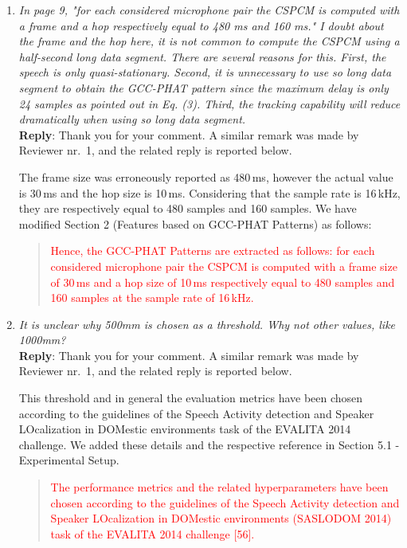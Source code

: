\documentclass[11pt, technote, letterpaper, oneside, onecolumn]{IEEEtran}
\begin{document}
\begin{enumerate}
\item  \textit{In page 9, "for each considered microphone pair the CSPCM is computed with a frame and a hop respectively equal to 480 ms and 160 ms." I doubt about the frame and the hop here, it is not common to compute the CSPCM using a half-second long data segment. There are several reasons for this. First, the speech is only quasi-stationary. Second, it is unnecessary to use so long data segment to obtain the GCC-PHAT pattern since the maximum delay is only 24 samples as pointed out in Eq. (3). Third, the tracking capability will reduce dramatically when using so long data segment.\\}
\textbf{Reply}: Thank you for your comment. A similar remark was made by Reviewer nr.\ 1, and the related reply is reported below.

The frame size was erroneously reported as 480\,ms, however the actual value is 30\,ms and the hop size is 10\,ms. Considering that the sample rate is 16\,kHz, they are respectively equal to 480 samples and 160 samples. We have modified Section 2 (Features based on GCC-PHAT Patterns) as follows:

\begin{quote}
	\textcolor{red}{Hence, the GCC-PHAT Patterns are extracted as follows: for each considered microphone pair the CSPCM is computed with a frame size of 30\,ms and a hop size of 10\,ms respectively equal to 480 samples and 160 samples at the sample rate of 16\,kHz.}
\end{quote}


\item  \textit{It is unclear why 500mm is chosen as a threshold. Why not other values, like 1000mm?\\}
\textbf{Reply}: Thank you for your comment.  A similar remark was made by Reviewer nr.\ 1, and the related reply is reported below.

This threshold and in general the evaluation metrics have been chosen according to the guidelines of the Speech Activity detection and Speaker LOcalization in DOMestic environments task of the EVALITA 2014 challenge. We added these details and the respective reference in Section 5.1 - Experimental Setup.
\begin{quote}
	\textcolor{red}{The performance metrics and the related hyperparameters have been chosen according to the guidelines of the Speech Activity detection and Speaker LOcalization in DOMestic environments (SASLODOM 2014) task of the EVALITA 2014 challenge [56].}
\end{quote}


\end{enumerate}
\end{document}
